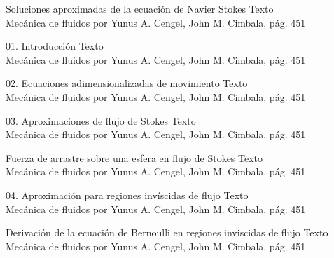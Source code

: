 \begin{frame}{Soluciones aproximadas de la ecuación de Navier Stokes}
\justifying
Texto
\\
{\tiny Mecánica de fluidos por Yunus A. Cengel, John M. Cimbala, pág. 451}
\end{frame}


\begin{frame}{01. Introducción}
\justifying
Texto
\\
{\tiny Mecánica de fluidos por Yunus A. Cengel, John M. Cimbala, pág. 451}
\end{frame}


\begin{frame}{02. Ecuaciones adimensionalizadas de movimiento}
\justifying
Texto
\\
{\tiny Mecánica de fluidos por Yunus A. Cengel, John M. Cimbala, pág. 451}
\end{frame}


\begin{frame}{03. Aproximaciones de flujo de Stokes}
\justifying
Texto
\\
{\tiny Mecánica de fluidos por Yunus A. Cengel, John M. Cimbala, pág. 451}
\end{frame}


\begin{frame}{Fuerza de arrastre sobre una esfera en flujo de Stokes}
\justifying
Texto
\\
{\tiny Mecánica de fluidos por Yunus A. Cengel, John M. Cimbala, pág. 451}
\end{frame}


\begin{frame}{04. Aproximación para regiones invíscidas de flujo}
\justifying
Texto
\\
{\tiny Mecánica de fluidos por Yunus A. Cengel, John M. Cimbala, pág. 451}
\end{frame}


\begin{frame}{Derivación de la ecuación de Bernoulli en regiones inviscidas de flujo}
\justifying
Texto
\\
{\tiny Mecánica de fluidos por Yunus A. Cengel, John M. Cimbala, pág. 451}
\end{frame}

